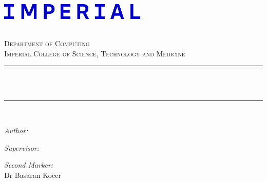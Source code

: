 
\begin{titlepage}

\newcommand{\HRule}{\rule{\linewidth}{0.5mm}} %


\includegraphics[width = 7cm]{./title/figures/imperial3.png}\\[0.25cm] 

\center %
 

\textsc{\LARGE \reporttype}\\[0.5cm] 
\textsc{\Large Department of Computing}\\[0.5cm] 
\textsc{\large Imperial College of Science, Technology and Medicine}\\[0.5cm] 


\HRule \\[0.4cm]
{ \huge \bfseries \reporttitle}\\ %
\HRule \\[0.5cm]
 
\begin{minipage}{0.32\textwidth}
	\begin{flushleft} \large
	\emph{Author:}\\
	\reportauthor %
	\end{flushleft}
	\end{minipage}
	\hfill
	\begin{minipage}{0.32\textwidth}
	\begin{flushright} \large
	\emph{Supervisor:} \\
	\supervisor %
	\end{flushright}
	\end{minipage}
	\hfill
	\begin{minipage}{0.32\textwidth}
	\begin{flushright} \large
	\emph{Second Marker:} \\
	Dr Basaran Kocer
	\end{flushright}
\end{minipage}\\[0.5cm]
	


\end{titlepage}
